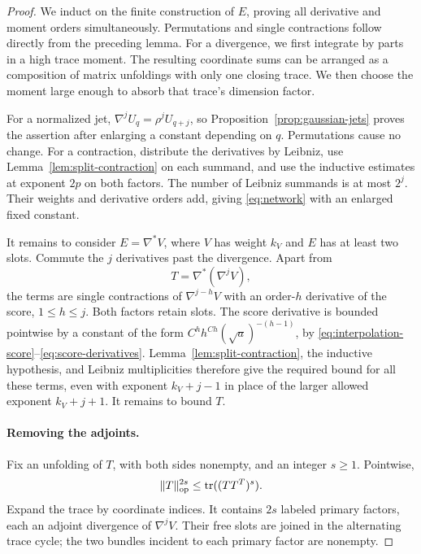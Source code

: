 \begin{proof}
We induct on the finite construction of $E$, proving all derivative
and moment orders simultaneously.  Permutations and single contractions
follow directly from the preceding lemma.  For a divergence, we first
integrate by parts in a high trace moment.  The resulting coordinate
sums can be arranged as a composition of matrix unfoldings with only
one closing trace.  We then choose the moment large enough to absorb
that trace's dimension factor.

For a normalized jet,
$\nabla^jU_q=\rho^jU_{q+j}$, so
Proposition~\ref{prop:gaussian-jets} proves the assertion after
enlarging a constant depending on $q$.  Permutations cause no change.
For a contraction, distribute the derivatives by Leibniz, use
Lemma~\ref{lem:split-contraction} on each summand, and use the
inductive estimates at exponent $2p$ on both factors.  The number of
Leibniz summands is at most $2^j$.  Their weights and derivative
orders add, giving \eqref{eq:network} with an enlarged fixed constant.

It remains to consider $E=\nabla^*V$, where $V$ has weight $k_V$ and
$E$ has at least two slots.  Commute the $j$ derivatives past the
divergence.  Apart from
\[
 T=\nabla^*(\nabla^jV),
\]
the terms are single contractions of $\nabla^{j-h}V$ with an
order-$h$ derivative of the score, $1\le h\le j$.  Both factors
retain slots.  The score derivative is bounded pointwise by a
constant of the form $C^h h^{Ch}(\sqrt a)^{-(h-1)}$, by
\eqref{eq:interpolation-score}--\eqref{eq:score-derivatives}.
Lemma~\ref{lem:split-contraction}, the inductive hypothesis, and
Leibniz multiplicities therefore give the required bound for all
these terms, even with exponent $k_V+j-1$ in place of the larger
allowed exponent $k_V+j+1$.  It remains to bound $T$.

\paragraph{Removing the adjoints.}
Fix an unfolding of $T$, with both sides nonempty, and an integer
$s\ge1$.  Pointwise,
\[
 \|T\|_{\mathrm{op}}^{2s}\le\operatorname{tr}((TT^T)^s).
\]
Expand the trace by coordinate indices.  It contains $2s$ labeled
primary factors, each an adjoint divergence of $\nabla^jV$.
Their free slots are joined in the alternating trace cycle; the two
bundles incident to each primary factor are nonempty.


\end{proof}
